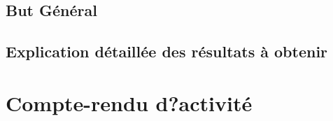 \documentclass[a4paper, 11pt, french]{report}
\begin{document}
                                                                                                                                                                                                                                                      \subsection{But
                                                                                                                                                                                                                                                      Général}
                                                                                                                                                                                                                                                          \subsection{Explication
                                                                                                                                                                                                                                                          détaillée
                                                                                                                                                                                                                                                          des
                                                                                                                                                                                                                                                          résultats
                                                                                                                                                                                                                                                          à
                                                                                                                                                                                                                                                          obtenir}
                                                                                                                                                                                                                                                            \section{Compte-rendu
                                                                                                                                                                                                                                                            d?activité}
\end{document}
